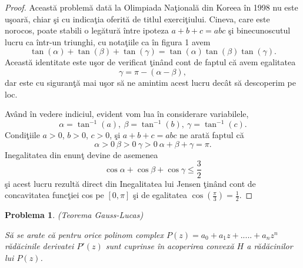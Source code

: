 \documentclass[a4paper,12pt,oneside]{report}
\newtheorem{problem}{Problema}
\begin{document}
\begin{proof}
Aceast\u{a} problem\u{a} dat\u{a} la Olimpiada Na\c{t}ional\u{a} din Koreea \^{i}n 1998 nu este u\c{s}oar\u{a}, chiar \c{s}i cu indica\c{t}ia oferit\u{a} de titlul exerci\c{t}iului. Cineva, care este norocos, poate stabili o leg\u{a}tur\u{a} \^{i}ntre  ipoteza \(a + b + c = abc\) \c{s}i binecunoscutul lucru ca \^{i}ntr-un triunghi, cu nota\c{t}iile  ca \^{i}n figura 1
 avem
 \begin{displaymath}
   \tan\left ( \alpha  \right ) + \tan\left ( \beta   \right ) + \tan\left ( \gamma   \right ) = \tan\left ( \alpha  \right )\tan\left ( \beta   \right )\tan\left ( \gamma   \right ).
 \end{displaymath}
Aceast\u{a} identitate este u\c{s}or de verificat \c{t}in\^{a}nd cont de faptul c\u{a} avem egalitatea \[\gamma  = \pi  - \left ( \alpha  - \beta  \right ),\] dar este cu siguran\c{t}\u{a} mai u\c{s}or s\u{a} ne amintim acest lucru dec\^{a}t s\u{a} descoperim pe loc.

Av\^{a}nd \^{i}n vedere indiciul, evident vom lua \^{i}n considerare variabilele,  \[\alpha  = \tan^{-1}\left ( a \right ),~ \beta = \tan ^{-1}\left ( b \right ),~\gamma  = \tan ^{-1}\left ( c \right ).\]
Condi\c{t}iile \(a> 0\), \(b> 0\), \(c> 0\), \c{s}i \(a+b+c = abc\) ne arat\u{a} faptul c\u{a} \[\alpha > 0 ~\beta > 0~\gamma > 0~\alpha + \beta + \gamma  = \pi.\] Inegalitatea din enun\c{t} devine de asemenea \[\cos \alpha  + \cos \beta  + \cos \gamma  \leq \frac{3}{2}\] \c{s}i acest lucru rezult\u{a} direct din Inegalitatea lui Jensen  \c{t}in\^{a}nd cont de  concavitatea func\c{t}iei cos
 pe \(\left [ 0 , \pi  \right ]\)  \c{s}i de egalitatea \(\cos \left ( \frac{\pi }{3} \right ) = \frac{1}{2}\).
\end{proof}
\begin{problem} (Teorema Gauss-Lucas)

S\u{a} se arate c\u{a} pentru orice polinom complex \(P\left ( z \right ) = a_{0} + a_{1}z + ..... +a_{n}z^{n}\) r\u{a}d\u{a}cinile derivatei \({P}'\left ( z \right )\) sunt cuprinse \^{i}n acoperirea convex\u{a} \(H\) a r\u{a}d\u{a}cinilor lui \(P\left ( z \right )\).
\end{problem}
\end{document}

